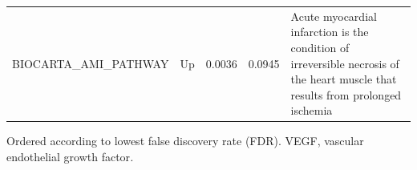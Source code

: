\documentclass[authordate, empirical,issue]{jote-new-article}
\begin{document}
\begin{table}[h!]
\begin{fullwidth}
\begin{tabularx}{\linewidth}{@{} X l l l X @{}}
      BIOCARTA\_AMI\_PATHWAY                                                      & Up                                                                                                          & 0.0036                                                                                                                                                       & 0.0945 & Acute myocardial infarction is the condition of irreversible necrosis of the heart muscle that results from prolonged ischemia
      \\
    \end{tabularx}
    Ordered according to lowest false discovery rate (FDR). VEGF, vascular endothelial growth factor\emph{.}
  \end{fullwidth}
\end{table}
\end{document}
